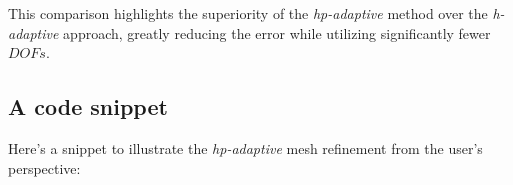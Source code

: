 This comparison highlights the superiority of the \textit{hp-adaptive} method over the \textit{h-adaptive} approach, greatly reducing the error while utilizing significantly fewer $DOFs$.

\newpage
\subsection{A code snippet}

Here's a snippet to illustrate the \textit{hp-adaptive} mesh refinement from the user's perspective:

